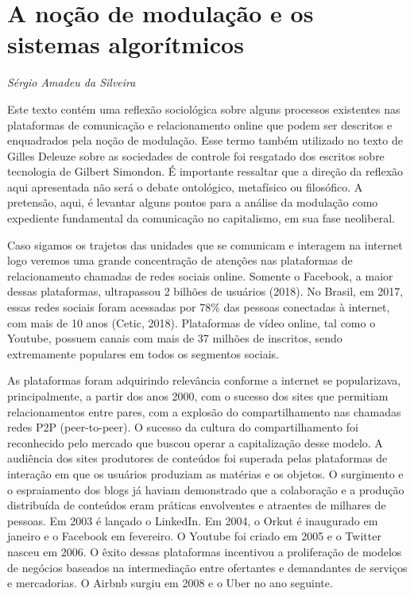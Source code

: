 \chapter{A noção de modulação e os sistemas algorítmicos}

\begin{flushright}
\emph{Sérgio Amadeu da Silveira}
\end{flushright}

Este texto contém uma reflexão sociológica sobre alguns processos
existentes nas plataformas de comunicação e relacionamento online que
podem ser descritos e enquadrados pela noção de modulação. Esse termo
também utilizado no texto de Gilles Deleuze sobre as sociedades de
controle foi resgatado dos escritos sobre tecnologia de Gilbert
Simondon. É importante ressaltar que a direção da reflexão aqui
apresentada não será o debate ontológico, metafísico ou filosófico. A
pretensão, aqui, é levantar alguns pontos para a análise da modulação
como expediente fundamental da comunicação no capitalismo, em sua fase
neoliberal.

Caso sigamos os trajetos das unidades que se comunicam e interagem na
internet logo veremos uma grande concentração de atenções nas
plataformas de relacionamento chamadas de redes sociais online. Somente
o Facebook, a maior dessas plataformas, ultrapassou 2 bilhões de
usuários (2018). No Brasil, em 2017, essas redes sociais foram acessadas
por 78\% das pessoas conectadas à internet, com mais de 10 anos (Cetic,
2018). Plataformas de vídeo online, tal como o Youtube, possuem canais
com mais de 37 milhões de inscritos, sendo extremamente populares em
todos os segmentos sociais.

As plataformas foram adquirindo relevância conforme a internet se
popularizava, principalmente, a partir dos anos 2000, com o sucesso dos
sites que permitiam relacionamentos entre pares, com a explosão do
compartilhamento nas chamadas redes P2P (peer-to-peer). O sucesso da
cultura do compartilhamento foi reconhecido pelo mercado que buscou
operar a capitalização desse modelo. A audiência dos sites produtores de
conteúdos foi superada pelas plataformas de interação em que os usuários
produziam as matérias e os objetos. O surgimento e o espraiamento dos
blogs já haviam demonstrado que a colaboração e a produção distribuída
de conteúdos eram práticas envolventes e atraentes de milhares de
pessoas. Em 2003 é lançado o LinkedIn. Em 2004, o Orkut é inaugurado em
janeiro e o Facebook em fevereiro. O Youtube foi criado em 2005 e o
Twitter nasceu em 2006. O êxito dessas plataformas incentivou a
proliferação de modelos de negócios baseados na intermediação entre
ofertantes e demandantes de serviços e mercadorias. O Airbnb surgiu em
2008 e o Uber no ano seguinte.

